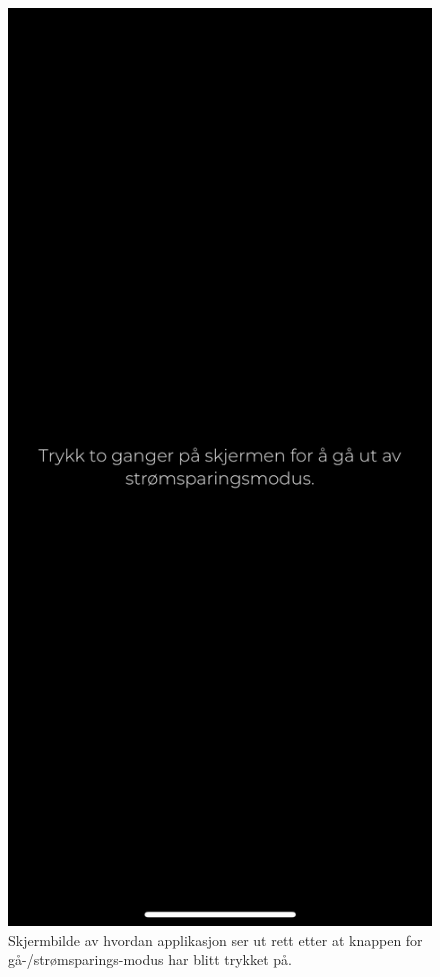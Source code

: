 \begin{figure}[H]
\centering
\captionsetup{width=.8\linewidth}
\includegraphics[scale=0.4]{Figurer/skjermbilder/stromsparing.png}
\caption{Skjermbilde av hvordan applikasjon ser ut rett etter at knappen for gå-/strømsparings-modus har blitt trykket på.}
\label{fig:stromsparing}
\end{figure}

